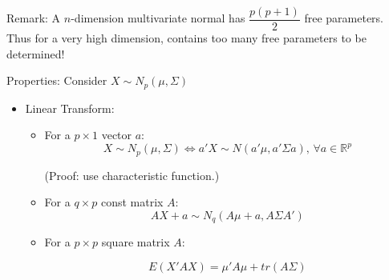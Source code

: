     
    

    Remark: A $ n $-dimension multivariate normal has $ \dfrac{p(p+1)}{2} $ free parameters. Thus for a very high dimension, contains too many free parameters to be determined! 
    
    Properties: Consider $ X\sim N_p(\mu,\Sigma) $
    \begin{itemize}[topsep=6pt,itemsep=4pt]
        \item Linear Transform:
        \begin{itemize}[topsep=6pt,itemsep=4pt]       
        \item For a $ p\times 1 $ vector $ a $:
        \begin{equation}
            X\sim N_p(\mu,\Sigma )\Leftrightarrow a'X\sim N(a'\mu,a'\Sigma a),\,\forall a\in\mathbb{R}^p 
        \end{equation}

        (Proof: use characteristic function.)
        
        \item For a $ q\times p $ const matrix $ A $:
        \begin{equation}\label{EqaTransformOfMultiNormal}
            AX+a\sim N_q(A\mu+a,A\Sigma  A')
        \end{equation}
        \item For a $ p\times p    $ square matrix $ A $:
        
        \begin{equation}\label{EqaExpectationOfQuadric}
            E(X'AX)= \mu'A\mu +tr(A\Sigma )            
        \end{equation}
        

\end{itemize}
\end{itemize}
